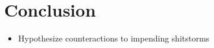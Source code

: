 \chapter{Conclusion}
\label{ch:conclusion}

\begin{itemize}
    \item
    Hypothesize counteractions to impending shitstorms

\end{itemize}